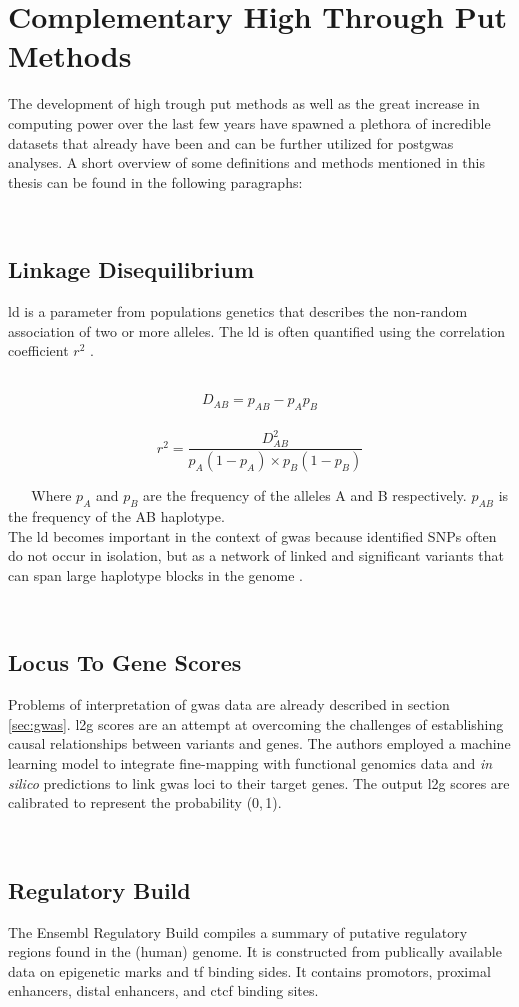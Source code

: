     \section{Complementary High Through Put Methods}
    \label{sec:bioinformatics}
    The development of high trough put methods as well as the great increase in computing power over the last few years have spawned a plethora of incredible datasets that already have been and can be further utilized for post\ac{gwas} analyses. A short overview of some definitions and methods mentioned in this thesis can be found in the following paragraphs:

    \subsection{Linkage Disequilibrium}
    \label{subsec:ld}
    \Ac{ld} is a parameter from populations genetics that describes the non-random association of two or more alleles. The \ac{ld} is often quantified using the correlation coefficient $r^2$ \cite{slatkinLinkageDisequilibriumUnderstanding2008}.

        $$ D_{AB} = p_{AB} − p_A p_B $$
        $$ r^2 = \frac{D_{AB}^2}{p_A (1-p_A) \times p_B (1-p_B)} $$

    Where $p_A$ and $p_B$ are the frequency of the alleles A and B respectively. $p_{AB}$ is the frequency of the AB haplotype.\\
    The \ac{ld} becomes important in the context of \ac{gwas} because identified SNPs often do not occur in isolation, but as a network of linked and significant variants that can span large haplotype blocks in the genome \cite{slatkinLinkageDisequilibriumUnderstanding2008}.

    \subsection{Locus To Gene Scores}
    Problems of interpretation of \ac{gwas} data are already described in section \ref{sec:gwas}. \Ac{l2g} scores are an attempt at overcoming the challenges of establishing causal relationships between variants and genes. The authors employed a machine learning model to integrate fine-mapping with functional genomics data and \textit{in silico} predictions to link \ac{gwas} loci to their target genes. The output \ac{l2g} scores are calibrated to represent the probability (0,\,1). \cite{mountjoyOpenApproachSystematically2021}

    \subsection{Regulatory Build}
    The Ensembl Regulatory Build compiles a summary of putative regulatory regions found in the (human) genome. It is constructed from publically available data on epigenetic marks and \ac{tf} binding sides. It contains promotors, proximal enhancers, distal enhancers, and \ac{ctcf} binding sites. \cite{zerbinoEnsemblRegulatoryBuild2015}

